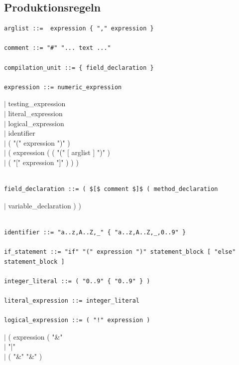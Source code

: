 \documentclass[10pt,a4paper,titlepage]{article}
\begin{document}
\subsection{Produktionsregeln}
\begin{verbatim}
arglist ::=  expression { "," expression }

comment ::= "#" "... text ..."

compilation_unit ::= { field_declaration }

expression ::= numeric_expression
\end{verbatim} 
		\hspace*{3cm}$\mid$ testing\_expression\\
		\hspace*{3cm}$\mid$ literal\_expression\\
		\hspace*{3cm}$\mid$ logical\_expression\\
		\hspace*{3cm}$\mid$ identifier\\
		\hspace*{3cm}$\mid$ ( "(" expression ")" )\\
		\hspace*{3cm}$\mid$ ( expression ( ( "(" $[$ arglist $]$ ")" )\\
					\hspace*{6.3cm}$\mid$ ( "[" expression "]" ) ) )
\begin{verbatim}

field_declaration ::= ( $[$ comment $]$ ( method_declaration 
\end{verbatim}
					\hspace*{7cm}$\mid$ variable\_declaration ) )
\begin{verbatim}
			
identifier ::= "a..z,A..Z,_" { "a..z,A..Z,_,0..9" }

if_statement ::= "if" "(" expression ")" statement_block [ "else" statement_block ]

integer_literal ::= ( "0..9" { "0..9" } )

literal_expression ::= integer_literal

logical_expression ::= ( "!" expression )
\end{verbatim}
		\hspace*{4.5cm}$\mid$ ( expression ( "\&" \\
				\hspace*{7.5cm}$\mid$ "|" \\
				\hspace*{7.5cm}$\mid$ ( "\&" "\&" )\\
\end{document}
